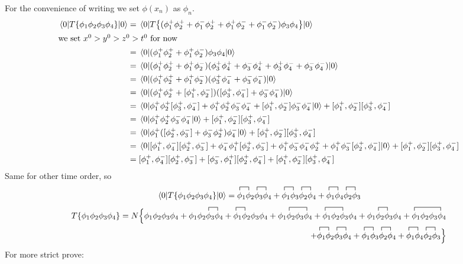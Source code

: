 \documentclass{article}
\newcommand{\conphi}[2]{\contraction{}{\phi}{_1}{\phi}\phi_{#1}\phi_{#2}}
\newcommand{\conphit}[3]{\contraction{}{\phi}{_{1}{#2}}{\phi}\phi_{#1}{#2}\phi_{#3}}
\begin{document}
For the convenience of writing we set $\phi(x_n)$ as $\phi_n$.
\begin{align*}
  \mel{0}{T\Bqty{\phi_1\phi_2\phi_3\phi_4}}{0}&=\mel{0}{T\Bqty{(\phi_1^+\phi_2^++\phi_1^-\phi_2^++\phi_1^+\phi_2^-+\phi_1^-\phi_2^-)\phi_3\phi_4}}{0}\\
  \intertext{we set $x^0>y^0>z^0>t^0$ for now}
  &=\mel{0}{(\phi_1^+\phi_2^++\phi_1^+\phi_2^-)\phi_3\phi_4}{0}\\
  &=\mel{0}{(\phi_1^+\phi_2^++\phi_1^+\phi_2^-)(\phi_3^+\phi_4^++\phi_3^-\phi_4^++\phi_3^+\phi_4^-+\phi_3^-\phi_4^-)}{0}\\
  &=\mel{0}{(\phi_1^+\phi_2^++\phi_1^+\phi_2^-)(\phi_3^+\phi_4^-+\phi_3^-\phi_4^-)}{0}\\
  &=\mel{0}{(\phi_1^+\phi_2^++[\phi_1^+,\phi_2^-])([\phi_3^+,\phi_4^-]+\phi_3^-\phi_4^-)}{0}\\
  &=\mel{0}{\phi_1^+\phi_2^+[\phi_3^+,\phi_4^-]+\phi_1^+\phi_2^+\phi_3^-\phi_4^-+[\phi_1^+,\phi_2^-]\phi_3^-\phi_4^-}{0}+[\phi_1^+,\phi_2^-][\phi_3^+,\phi_4^-]\\
  &=\mel{0}{\phi_1^+\phi_2^+\phi_3^-\phi_4^-}{0}+[\phi_1^+,\phi_2^-][\phi_3^+,\phi_4^-]\\
  &=\mel{0}{\phi_1^+([\phi_2^+,\phi_3^-]+\phi_3^-\phi_2^+)\phi_4^-}{0}+[\phi_1^+,\phi_2^-][\phi_3^+,\phi_4^-]\\
  &=\mel{0}{[\phi_1^+,\phi_4^-][\phi_2^+,\phi_3^-]+\phi_4^-\phi_1^+[\phi_2^+,\phi_3^-]+\phi_1^+\phi_3^-\phi_4^-\phi_2^++\phi_1^+\phi_3^-[\phi_2^+,\phi_4^-]}{0}+[\phi_1^+,\phi_2^-][\phi_3^+,\phi_4^-]\\
  &=[\phi_1^+,\phi_4^-][\phi_2^+,\phi_3^-]+[\phi_3^-,\phi_1^+][\phi_2^+,\phi_4^-]+[\phi_1^+,\phi_2^-][\phi_3^+,\phi_4^-]
\end{align*}
Same for other time order, so
$$\mel{0}{T\Bqty{\phi_1\phi_2\phi_3\phi_4}}{0}=\contraction{}{\phi}{_1}{\phi}\phi_1\phi_2\contraction{}{\phi}{_1}{\phi}\phi_3\phi_4+\contraction{}{\phi}{_1}{\phi}\phi_1\phi_3\contraction{}{\phi}{_1}{\phi}\phi_2\phi_4+\contraction{}{\phi}{_1}{\phi}\phi_1\phi_4\contraction{}{\phi}{_1}{\phi}\phi_2\phi_3$$
\begin{align*}
  T\Bqty{\phi_1\phi_2\phi_3\phi_4}=N\Big\{\phi_1\phi_2\phi_3\phi_4+\phi_1\phi_2\conphi{3}{4}+\conphi{1}{2}\phi_3\phi_4+\phi_1\conphit{2}{\phi_3}{4}+\conphit{1}{\phi_2}{3}\phi_4+\phi_1\conphi{2}{3}\phi_4+\conphit{1}{\phi_2\phi_3}{4}\\+\contraction{}{\phi}{_1}{\phi}\phi_1\phi_2\contraction{}{\phi}{_1}{\phi}\phi_3\phi_4+\contraction{}{\phi}{_1}{\phi}\phi_1\phi_3\contraction{}{\phi}{_1}{\phi}\phi_2\phi_4+\contraction{}{\phi}{_1}{\phi}\phi_1\phi_4\contraction{}{\phi}{_1}{\phi}\phi_2\phi_3\Big\}
\end{align*}
For more strict prove:
\end{document}
